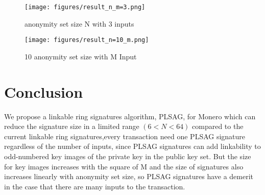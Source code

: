     \begin{figure}[htbp]
        \begin{minipage}[b]{0.45\linewidth}
        \centering
        \texttt{[image: figures/result\_n\_m=3.png]}
        \caption{anonymity set size N with 3 inputs}
        \end{minipage}
        \begin{minipage}[b]{0.45\linewidth}
        \centering
        \texttt{[image: figures/result\_n=10\_m.png]}
        \caption{10 anonymity set size with M Input}
        \end{minipage}
    \end{figure}
    
\section{Conclusion}
    We propose a linkable ring signatures algorithm, PLSAG, for Monero which can reduce the signature size in a limited range $(6<N<64)$ compared to the current linkable ring signatures,every transaction need one PLSAG signature regardless of the number of inputs, since PLSAG signatures can add linkability to odd-numbered key images of the private key in the public key set. But the size for key images increases with the square of M and the size of signatures also increases linearly with anonymity set size, so PLSAG signatures have a demerit in the case that there are many inputs to the transaction.
